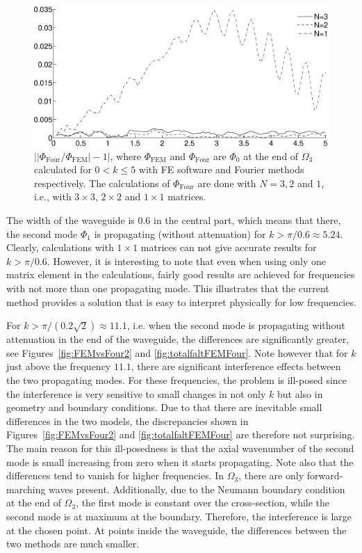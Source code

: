 \documentclass[numreferences]{kluwer}
\providecommand{\abs}[1]{\left\lvert#1\right\rvert}
\renewcommand{\Phi}{\varPhi}
\renewcommand{\Phi}{\varPhi}
\begin{document}
\begin{figure}[htb]
  \centering
  \includegraphics[width=0.9\linewidth]{relerr123}
  \caption{$\abs{\abs{\Phi_{\text{Four}}/\Phi_{\text{FEM}}}-1}$, where
    $\Phi_{\text{FEM}}$ and $\Phi_{\text{Four}}$ are $\Phi_0$ at the
    end of $\Omega_3$ calculated for $0<k\le5$ with FE software and
    Fourier methods respectively. The calculations of
    $\Phi_{\text{Four}}$ are done with $N=3,2$ and $1$, i.e., with
    $3\times3$, $2\times2$ and $1\times1$ matrices.}
  \label{fig:relerr123}
\end{figure}

The width of the waveguide is $0.6$ in the central part, which means
that there, the second mode $\Phi_1$ is propagating (without
attenuation) for $k>\pi/0.6\approx5.24$. Clearly, calculations with
$1\times1$ matrices can not give accurate results for $k>\pi/0.6$.
However, it is interesting to note that even when using only one
matrix element in the calculations, fairly good results are achieved
for frequencies with not more than one propagating mode. This
illustrates that the current method provides a solution that is easy
to interpret physically for low frequencies.

For $k>\pi/(0.2\sqrt2)\approx11.1$, i.e. when the second mode is
propagating without attenuation in the end of the waveguide, the
differences are significantly greater, see
Figures~\ref{fig:FEMvsFour2} and \ref{fig:totalfaltFEMFour}. Note
however that for $k$ just above the frequency $11.1$, there are
significant interference effects between the two propagating
modes. For these frequencies, the problem is ill-posed since the
interference is very sensitive to small changes in not only $k$ but
also in geometry and boundary conditions. Due to that there are
inevitable small differences in the two models, the discrepancies
shown in Figures~\ref{fig:FEMvsFour2} and \ref{fig:totalfaltFEMFour}
are therefore not surprising. The main reason for this ill-posedness
is that the axial wavenumber of the second mode is small increasing
from zero when it starts propagating. Note also that the differences
tend to vanish for higher frequencies.  In $\Omega_3$, there are only
forward-marching waves present. Additionally, due to the Neumann
boundary condition at the end of $\Omega_3$, the first mode is
constant over the cross-section, while the second mode is at maximum
at the boundary. Therefore, the interference is large at the chosen
point. At points inside the waveguide, the differences between the two
methods are much smaller.
\end{document}
